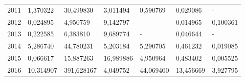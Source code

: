 \begin{table}
\begin{tabular}{p{1cm}p{2cm}p{2cm}p{2cm}p{2cm}p{2cm}p{2cm}}
 2011 &                                    1,370322 &       30,499830 &                                    3,011494 &                             0,590769 &                            0,029086 &        - \\
 2012 &                                    0,024895 &        4,950759 &                                    9,142797 &                                    - &                            0,014965 & 0,100361 \\
 2013 &                                    0,222585 &        6,383810 &                                    9,689774 &                                    - &                            0,046644 &        - \\
 2014 &                                    5,286740 &       44,780231 &                                    5,203184 &                             5,290705 &                            0,461232 & 0,019085 \\
 2015 &                                    0,066617 &       15,887263 &                                   16,989886 &                             4,950964 &                            0,483402 & 0,005525 \\
 2016 &                                   10,314907 &      391,628167 &                                    4,049752 &                            44,069400 &                           13,456669 & 3,927795 \\
\bottomrule
\end{tabular}
\end{table}
